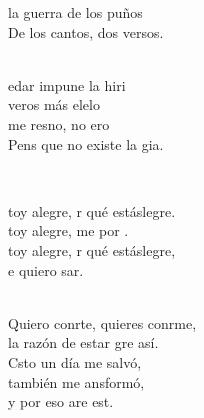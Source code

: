 \documentclass[12pt]{article}
\begin{document}
\begin{multicols*}{2}
\begin{cancion}
	 la guerra de los puños \\
	De los cantos, dos versos.\\\jump\\
	\begin{chorus}%
	edar impune la hiri\\
	 veros más elelo\\
	 me resno, no ero \\
	Pens que no existe la gia. \\
	\end{chorus}%
	\jump\\
\end{cancion}%

\begin{cancion}%
	\begin{chorus}%
	toy alegre, r qué estáslegre.\\
	toy alegre, me por . \\
	toy alegre, r qué estáslegre,\\
	e quiero sar.\\
	\end{chorus}%
	\jump\\
	Quiero conrte, quieres conrme,\\
	la razón de estar gre así.\\
	Csto un día me salvó,\\
	también me ansformó,\\
	y por eso are est.\\
\end{cancion}%


\end{multicols*}
\end{document}
